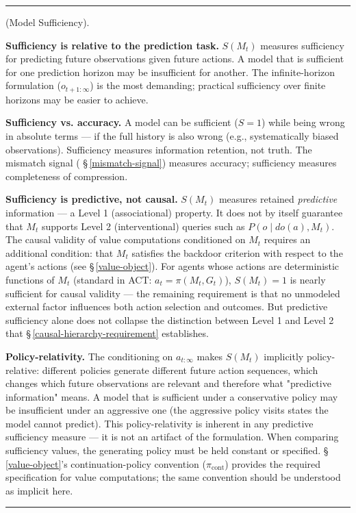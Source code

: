 \documentclass[11pt,oneside]{article}
\newcounter{claim}[section]
\renewcommand{\theclaim}{\thesection.\arabic{claim}}
\newenvironment{segment}[2]{%
  \refstepcounter{claim}%
  \bigskip\noindent\hrule\smallskip
  \noindent{\bfseries #1~\theclaim}\enskip(#2).\par\smallskip
  \noindent\ignorespaces
}{%
  \par\smallskip\noindent\hrule\bigskip
}
\newenvironment{definition}[1][]{\begin{segment}{Definition}{#1}}{\end{segment}}
\begin{document}
\begin{definition}[Model Sufficiency]
\textbf{Sufficiency is relative to the prediction task.} $S(M_t)$ measures sufficiency for predicting future observations given future actions. A model that is sufficient for one prediction horizon may be insufficient for another. The infinite-horizon formulation ($o_{t+1:\infty}$) is the most demanding; practical sufficiency over finite horizons may be easier to achieve.

\textbf{Sufficiency vs. accuracy.} A model can be sufficient ($S = 1$) while being wrong in absolute terms — if the full history is also wrong (e.g., systematically biased observations). Sufficiency measures information retention, not truth. The mismatch signal ( \S\,\ref{mismatch-signal}) measures accuracy; sufficiency measures completeness of compression.

\textbf{Sufficiency is predictive, not causal.} $S(M_t)$ measures retained \textit{predictive} information — a Level 1 (associational) property. It does not by itself guarantee that $M_t$ supports Level 2 (interventional) queries such as $P(o \mid do(a), M_t)$. The causal validity of value computations conditioned on $M_t$ requires an additional condition: that $M_t$ satisfies the backdoor criterion with respect to the agent's actions (see \S\,\ref{value-object}). For agents whose actions are deterministic functions of $M_t$ (standard in ACT: $a_t = \pi(M_t, G_t)$), $S(M_t) = 1$ is nearly sufficient for causal validity — the remaining requirement is that no unmodeled external factor influences both action selection and outcomes. But predictive sufficiency alone does not collapse the distinction between Level 1 and Level 2 that \S\,\ref{causal-hierarchy-requirement} establishes.

\textbf{Policy-relativity.} The conditioning on $a_{t:\infty}$ makes $S(M_t)$ implicitly policy-relative: different policies generate different future action sequences, which changes which future observations are relevant and therefore what "predictive information" means. A model that is sufficient under a conservative policy may be insufficient under an aggressive one (the aggressive policy visits states the model cannot predict). This policy-relativity is inherent in any predictive sufficiency measure — it is not an artifact of the formulation. When comparing sufficiency values, the generating policy must be held constant or specified. \S\,\ref{value-object}'s continuation-policy convention ($\pi_{\text{cont}}$) provides the required specification for value computations; the same convention should be understood as implicit here.

\end{definition}
\end{document}
